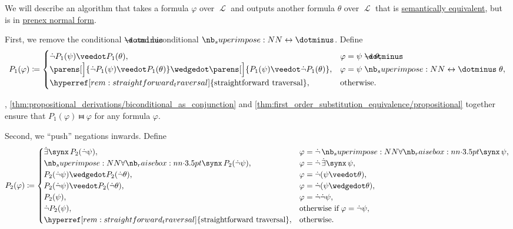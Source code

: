 \begin{algorithm}\label{alg:prenex_normal_form_conversion}
  We will describe an algorithm that takes a formula \( \varphi \) over \( \mscrL \) and outputs another formula \( \theta \) over \( \mscrL \) that is \hyperref[def:first_order_semantics/equivalence]{semantically equivalent}, but is in \hyperref[def:prenex_normal_form]{prenex normal form}.

  \begin{thmenum}
     First, we remove the conditional \( \synimplies \) and biconditional \( \syniff \). Define
    \begin{equation*}
      P_1(\varphi) \coloneqq \begin{cases}
        \synneg P_1(\psi) \synvee P_1(\theta),                                                                          &\varphi = \psi \synimplies \theta, \\
        \parens[\Big]{ \synneg P_1(\psi) \synvee P_1(\theta) } \synwedge \parens[\Big]{ P_1(\psi) \synvee \synneg P_1(\theta) }, &\varphi = \psi \syniff \theta, \\
        \hyperref[rem:straightforward_traversal]{\T{straightforward traversal}},                                  &\T{otherwise.}
      \end{cases}
    \end{equation*}

    , \cref{thm:propositional_derivations/biconditional_as_conjunction} and \cref{thm:first_order_substitution_equivalence/propositional} together ensure that \( P_1(\varphi) \gleichstark \varphi \) for any formula \( \varphi \).

     Second, we \enquote{push} negations inwards. Define
    \begin{equation*}
      P_2(\varphi) \coloneqq \begin{cases}
        \qexists \synx P_2(\synneg \psi),                                             &\varphi = \synneg \qforall \synx \psi, \\
        \qforall \synx P_2(\synneg \psi),                                             &\varphi = \synneg \qexists \synx \psi, \\
        P_2(\synneg \psi) \synwedge P_2(\synneg \theta),                                  &\varphi = \synneg (\psi \synvee \theta), \\
        P_2(\synneg \psi) \synvee P_2(\synneg \theta),                                    &\varphi = \synneg (\psi \synwedge \theta), \\
        P_2(\psi),                                                               &\varphi = \synneg \synneg \psi, \\
        \synneg P_2(\psi),                                                          &\T{otherwise if} \varphi = \synneg \psi, \\
        \hyperref[rem:straightforward_traversal]{\T{straightforward traversal}}, &\T{otherwise.}
      \end{cases}
    \end{equation*}


\end{thmenum}
\end{algorithm}
